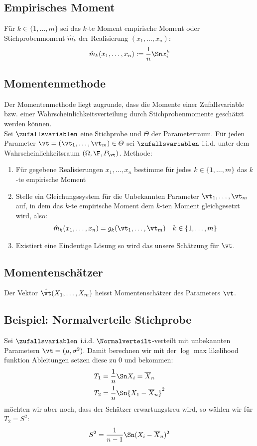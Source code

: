 \BoxEnd{}
\subsection*{Empirisches Moment}
Für $k \in \{1, \dots, m\}$ sei das $k$-te Moment empirische Moment oder
Stichprobenmoment $\hat{m}_k$ der Realisierung $ (x_1, \dots, x_n)$:
\begin{align*}
  \hat{m}_k (x_1, \dots, x_n) := \frac{1}{n} \Sn x_i^k
\end{align*}
\subsection*{Momentenmethode}
Der Momentenmethode liegt zugrunde, dass die Momente einer Zufallsvariable bzw.
einer Wahrscheinlichkeitsverteilung durch Stichprobenmomente geschätzt werden
können.\\ Sei $\zufallsvariablen$ eine Stichprobe und $\varTheta$ der
Parameterraum. Für jeden Parameter $\vt = (\vt_1, \dots, \vt_m) \in \varTheta$
sei $\zufallsvariablen$ i.i.d. unter dem Wahrscheinlichkeitsraum $ (\Omega, \F,
  P_\vt)$. Methode:
\begin{enumerate}
  \item Für gegebene Realisierungen $x_1, \dots, x_n$ bestimme für jedes $k \in \{1,
          \dots, m\}$ das $k$-te empirische Moment
  \item Stelle ein Gleichungssystem für die Unbekannten Parameter $\vt_1, \dots, \vt_m$
        auf, in dem das $k$-te empirische Moment dem $k$-ten Moment gleichgesetzt wird,
        also:
        \begin{align*}
          \hat{m}_k (x_1, \dots, x_n) = g_k (\vt_1, \dots, \vt_m)
           &  & k \in \{1, \dots, m\}
        \end{align*}
  \item Existiert eine Eindeutige Lösung so wird das unsere Schätzung für $\vt$.
\end{enumerate}
\subsection*{Momentenschätzer}
Der Vektor $\hat{\vt} (X_1, \dots, X_m)$ heisst Momentenschätzer des Parameters
$\vt$.
\subsection*{Beispiel: Normalverteile Stichprobe}
Sei $\zufallsvariablen$ i.i.d. $\Normalverteilt$-verteilt mit unbekannten
Parametern $\vt = (\mu, \sigma^2)$. Damit berechnen wir mit der $\log$ max
likelihood funktion Ableitungen setzen diese zu $0$ und bekommen:
\begin{align*}
  T_1 & = \frac{1}{n} \Sn X_i = \overline{X}_n     \\
  T_2 & = \frac{1}{n} \Sn {X_1 - \overline{X}_n}^2
\end{align*}
möchten wir aber noch, dass der Schätzer erwartungstreu wird,
so wählen wir für $T_2 = S^2$:
\begin{align*}
  S^2 = \frac{1}{n-1} \Sn  (X_i - \overline{X}_n)^2
\end{align*}
